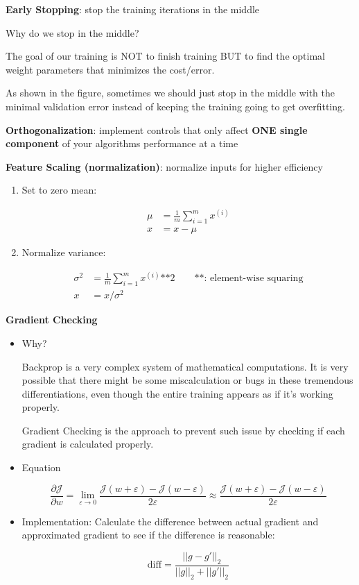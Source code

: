 \documentclass[
]{book}
\begin{document}
\textbf{Early Stopping}: stop the training iterations in the middle

Why do we stop in the middle?

The goal of our training is NOT to finish training BUT to find the
optimal weight parameters that minimizes the cost/error.

As shown in the figure, sometimes we should just stop in the middle with
the minimal validation error instead of keeping the training going to
get overfitting.

\textbf{Orthogonalization}: implement controls that only affect
\textbf{ONE single component} of your algorithms performance at a time

\textbf{Feature Scaling (normalization)}: normalize inputs for higher
efficiency

\begin{enumerate}
\def\labelenumi{\arabic{enumi}.}
\item
  Set to zero mean:

  \[\begin{align}
   \mu&=\frac{1}{m}\sum_{i=1}^{m}{x^{(i)}} \\
   x&=x-\mu
   \end{align}\]
\item
  Normalize variance:

  \[\begin{align}
   \sigma^2&=\frac{1}{m}\sum_{i=1}^{m}{x^{(i)}\text{**}2}\quad\quad \text{**: element-wise squaring} \\
   x&=x/\sigma^2
   \end{align}\]
\end{enumerate}

\textbf{Gradient Checking}

\begin{itemize}
\item
  Why?

  Backprop is a very complex system of mathematical computations. It is
  very possible that there might be some miscalculation or bugs in these
  tremendous differentiations, even though the entire training appears
  as if it's working properly.

  Gradient Checking is the approach to prevent such issue by checking if
  each gradient is calculated properly.
\item
  Equation

  \[\begin{equation}
    \frac{\partial{\mathcal{J}}}{\partial{w}}=\lim_{\varepsilon\rightarrow 0}\frac{\mathcal{J}(w+\varepsilon)-\mathcal{J}(w-\varepsilon)}{2\varepsilon}\approx\frac{\mathcal{J}(w+\varepsilon)-\mathcal{J}(w-\varepsilon)}{2\varepsilon}
    \end{equation}\]
\item
  Implementation: Calculate the difference between actual gradient and
  approximated gradient to see if the difference is reasonable:

  \[\begin{equation}
    \text{diff}=\frac{||g-g'||_ 2}{||g||_ 2+||g'||_ 2}
    \end{equation}\]
\end{itemize}
\end{document}
